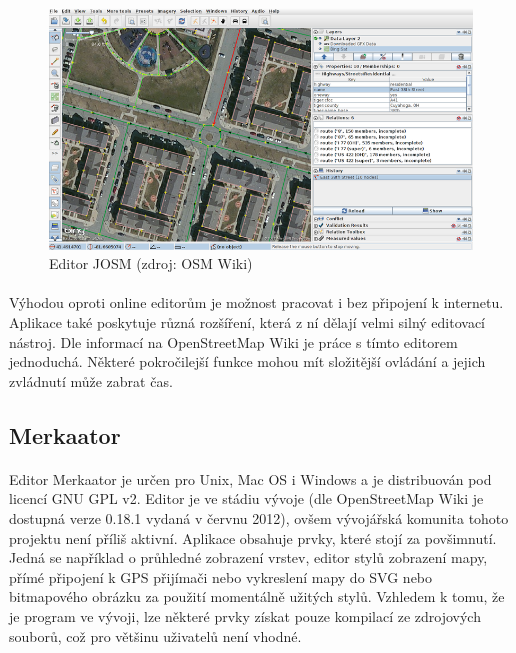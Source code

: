 \documentclass[11pt,a4paper,titlepage,oneside]{book}
\begin{document}
		\begin{figure}[!h]
			\begin{center}
				\includegraphics[width=12cm]{obrazky/josm_osm.png}
				\caption{Editor JOSM (zdroj: OSM Wiki\cite{wiki_josm})}
				\label{fig:josm_osm}
			\end{center}
		\end{figure}
			\paragraph{} Výhodou oproti online editorům je možnost pracovat i bez připojení k internetu. Aplikace také poskytuje různá rozšíření, která z ní dělají velmi silný editovací nástroj. Dle informací na OpenStreetMap Wiki\cite{wiki_josm} je práce s tímto editorem jednoduchá. Některé pokročilejší funkce mohou mít složitější ovládání a jejich zvládnutí může zabrat čas.

		\subsection{Merkaator}
			\paragraph{} Editor Merkaator je určen pro Unix, Mac OS i Windows a je distribuován pod licencí GNU GPL v2. Editor je ve stádiu vývoje (dle OpenStreetMap Wiki je dostupná verze 0.18.1 vydaná v červnu 2012), ovšem vývojářská komunita tohoto projektu není příliš aktivní. Aplikace obsahuje prvky, které stojí za povšimnutí. Jedná se například o průhledné zobrazení vrstev, editor stylů zobrazení mapy, přímé připojení k GPS přijímači nebo vykreslení mapy do SVG nebo bitmapového obrázku za použití momentálně užitých stylů. Vzhledem k tomu, že je program ve vývoji, lze některé prvky získat pouze kompilací ze zdrojových souborů, což pro většinu uživatelů není vhodné.
\end{document}
